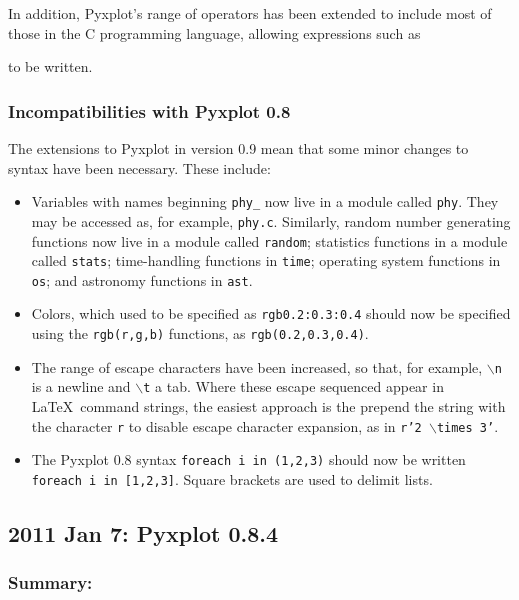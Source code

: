 In addition, Pyxplot's range of operators has been extended to include most of those in the C programming language, allowing expressions such as

\vspace{3mm}

\vspace{3mm}

\noindent to be written.

\subsubsection*{Incompatibilities with Pyxplot 0.8}

The extensions to Pyxplot in version 0.9 mean that some minor changes to syntax have been necessary. These include:

\begin{itemize}
\item Variables with names beginning {\tt phy\_} now live in a module called {\tt phy}. They may be accessed as, for example, {\tt phy.c}. Similarly, random number generating functions now live in a module called {\tt random}; statistics functions in a module called {\tt stats}; time-handling functions in {\tt time}; operating system functions in {\tt os}; and astronomy functions in {\tt ast}.
\item Colors, which used to be specified as {\tt rgb0.2:0.3:0.4} should now be specified using the {\tt rgb(r,g,b)} functions, as {\tt rgb(0.2,0.3,0.4)}.
\item The range of escape characters have been increased, so that, for example, {\tt $\backslash$n} is a newline and {\tt $\backslash$t} a tab. Where these escape sequenced appear in \LaTeX\ command strings, the easiest approach is the prepend the string with the character {\tt r} to disable escape character expansion, as in {\tt r'2 $\backslash$times 3'}.
\item The Pyxplot 0.8 syntax {\tt foreach i in (1,2,3)} should now be written {\tt foreach i in [1,2,3]}. Square brackets are used to delimit lists.
\end{itemize}

\subsection*{2011 Jan 7: Pyxplot 0.8.4}

\subsubsection*{Summary:}

